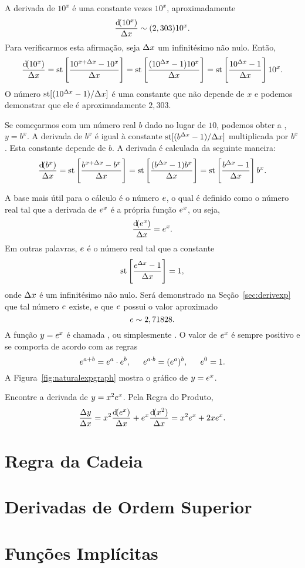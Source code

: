 A derivada de $10^x$ é uma constante vezes $10^x$, aproximadamente
$$
  \frac{\dif(10^x)}{\dx} \sim (2,303)10^x.
$$
Para verificarmos esta afirmação, seja $\Delta x$ um infinitésimo não nulo.
Então,
$$
  \frac{\dif(10^x)}{\dx} = \std\left[\frac{10^{x + \Dx} - 10^x}{\Dx}\right]
    = \std\left[\frac{(10^{\Dx} - 1)10^x}{\Dx}\right]
    = \std\left[\frac{10^{\Dx} - 1}{\Dx}\right]10^x.
$$
O número $\operatorname{st}[(10^{\Delta x} - 1)/\Delta x]$ é uma constante que não depende de $x$ e
podemos demonstrar que ele é aproximadamente $2,303$.

Se começarmos com um número real $b$ dado no lugar de $10$, podemos obter
a ,
$y = b^x$. A derivada de $b^x$ é igual à constante $\operatorname{st}[(b^{\Delta x} - 1)/\Delta x]$
multiplicada por $b^x$. Esta constante depende de $b$. A derivada é calculada
da seguinte maneira:
$$
  \frac{\dif(b^x)}{\dx} = \std\left[\frac{b^{x + \Dx} - b^x}{\Dx}\right]
    = \std\left[\frac{(b^{\Dx} - 1)b^x}{\Dx}\right]
    = \std\left[\frac{b^{\Dx} - 1}{\Dx}\right]b^x.
$$

A base mais útil para o cálculo é o número $e$, o qual é definido como
o número real tal que a derivada de $e^x$ é a própria função $e^x$, ou
seja,
$$
  \frac{\dif(\e^x)}{\dx} = \e^x.
$$
Em outras palavras, $e$ é o número real tal que a constante
$$
  \operatorname{st}\left[ \frac{e^{\Delta x}-1}{\Delta x} \right] = 1,
$$
onde $\Delta x$ é um infinitésimo não nulo. Será demonstrado na
Seção~\ref{sec:derivexp} que tal número $e$ existe, e que $e$ possui
o valor aproximado
$$
  e \sim 2,71828.
$$
A função $y = e^x$ é chamada , ou simplesmente . O valor
de $e^x$ é sempre positivo e se comporta de acordo com as regras
$$
  e^{a+b} = e^a \cdot e^b, \hspace{1.5em}
  e^{a \cdot b} = (e^a)^b, \hspace{1.5em}
  e^0 = 1.
$$
A Figura~\ref{fig:naturalexpgraph} mostra o gráfico de $y = e^x$.


\begin{example}
Encontre a derivada de $y = x^2 e^x$. Pela Regra do Produto,
$$
  \frac{\dy}{\dx} = x^2 \frac{\dif(\e^x)}{\dx} +
    \e^x \frac{\dif(x^2)}{\dx} = x^2 \e^x + 2x \e^x.
$$
\end{example}

\section{Regra da Cadeia}
\label{sec:chainrule}

\section{Derivadas de Ordem Superior}
\label{sec:higherderivs}

\section{Funções Implícitas}
\label{sec:implicitfunc}

\begin{chapterproblems}
\end{chapterproblems}


